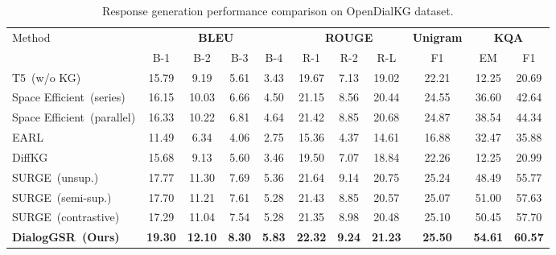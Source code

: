 \begin{table}[ht!]
    \centering
    \small
    \begin{tabular}{l|cccc|ccc|c|cc}
        \toprule
        \multirow{2}{*}{Method}  &  \multicolumn{4}{c|}{\textbf{BLEU}} & \multicolumn{3}{c|}{\textbf{ROUGE}}& \textbf{Unigram} &\multicolumn{2}{c}{\textbf{KQA}}\\
          &  B-1 & B-2 & B-3 & B-4 & R-1 & R-2 &R-L&  F1& EM& F1\\
         \midrule 
         \midrule
         T5~(w/o KG)  &  15.79 & 9.19 & 5.61 & 3.43 & 19.67& 7.13& 19.02& 22.21 & 12.25& 20.69\\
         Space Efficient~(series) &16.15&10.03&6.66&4.50&21.15 &8.56&20.44& 24.55& 36.60& 42.64\\
         Space Efficient~(parallel)  &16.33& 10.22& 6.81& 4.64& 21.42& 8.85& 20.68 & 24.87& 38.54 & 44.34\\
         EARL  &11.49 & 6.34 & 4.06 & 2.75 & 15.36 & 4.37 & 14.61 & 16.88 & 32.47 & 35.88\\
         DiffKG  &15.68 & 9.13 & 5.60 & 3.46 & 19.50 & 7.07 & 18.84 & 22.26 & 12.25 & 20.99\\
         SURGE~(unsup.)  &17.77 &11.30 &7.69 &5.36  & 21.64 & 9.14 & 20.75 & 25.24 & 48.49 & 55.77\\
         SURGE~(semi-sup.) &17.70 & 11.21 & 7.61 & 5.28 &21.43 & 8.85 & 20.57& 25.07 & 51.00 & 57.63\\
         SURGE~(contrastive) &17.29 & 11.04 & 7.54 & 5.28 &21.35 & 8.98 & 20.48& 25.10& 50.45 & 57.70\\
         \midrule
         \textbf{DialogGSR~(Ours)} &\textbf{19.30}&\textbf{12.10}& \textbf{8.30}& \textbf{5.83} &\textbf{22.32} & \textbf{9.24} & \textbf{21.23} & \textbf{25.50}& \textbf{54.61}& \textbf{60.57}\\
        \bottomrule
    \end{tabular}
    \vspace{-5pt}
    \caption{Response generation performance comparison on OpenDialKG dataset. 
    }
\label{tab:opendialkg}
\end{table}
